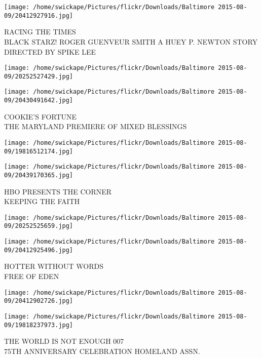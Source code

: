 \documentclass[10pt,letterpaper]{article}
\begin{document}
\vspace{0.25in}
\texttt{[image: /home/swickape/Pictures/flickr/Downloads/Baltimore 2015-08-09/20412927916.jpg]}

RACING THE TIMES\\
BLACK STARZ!  ROGER GUENVEUR SMITH A HUEY P. NEWTON STORY DIRECTED BY SPIKE LEE\\
\pagebreak

\texttt{[image: /home/swickape/Pictures/flickr/Downloads/Baltimore 2015-08-09/20252527429.jpg]}

\vspace{0.25in}
\texttt{[image: /home/swickape/Pictures/flickr/Downloads/Baltimore 2015-08-09/20430491642.jpg]}

COOKIE'S FORTUNE\\
THE MARYLAND PREMIERE OF MIXED BLESSINGS\\
\pagebreak

\texttt{[image: /home/swickape/Pictures/flickr/Downloads/Baltimore 2015-08-09/19816512174.jpg]}

\vspace{0.25in}
\texttt{[image: /home/swickape/Pictures/flickr/Downloads/Baltimore 2015-08-09/20439170365.jpg]}

HBO PRESENTS THE CORNER\\
KEEPING THE FAITH\\
\pagebreak

\texttt{[image: /home/swickape/Pictures/flickr/Downloads/Baltimore 2015-08-09/20252525659.jpg]}

\vspace{0.25in}
\texttt{[image: /home/swickape/Pictures/flickr/Downloads/Baltimore 2015-08-09/20412925496.jpg]}

HOTTER WITHOUT WORDS\\
FREE OF EDEN\\
\pagebreak

\texttt{[image: /home/swickape/Pictures/flickr/Downloads/Baltimore 2015-08-09/20412902726.jpg]}

\vspace{0.25in}
\texttt{[image: /home/swickape/Pictures/flickr/Downloads/Baltimore 2015-08-09/19818237973.jpg]}

THE WORLD IS NOT ENOUGH 007\\
75TH ANNIVERSARY CELEBRATION HOMELAND ASSN.\\
\pagebreak
\end{document}
